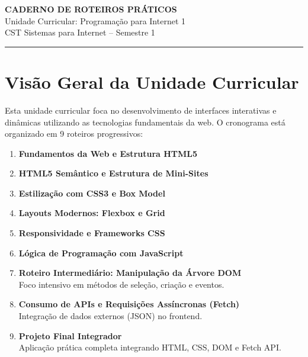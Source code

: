 \documentclass[12pt,a4paper]{article}
\begin{document}
\begin{center}
    {\Large \textbf{CADERNO DE ROTEIROS PRÁTICOS}}\\
    Unidade Curricular: Programação para Internet 1\\
    CST Sistemas para Internet -- Semestre 1
\end{center}

\vspace{0.5cm}
\hrule
\vspace{0.8cm}

\tableofcontents
\newpage

\section{Visão Geral da Unidade Curricular}

Esta unidade curricular foca no desenvolvimento de interfaces interativas e dinâmicas utilizando as tecnologias fundamentais da web. O cronograma está organizado em 9 roteiros progressivos:

\begin{enumerate}
    \item \textbf{Fundamentos da Web e Estrutura HTML5}
    \item \textbf{HTML5 Semântico e Estrutura de Mini-Sites}
    \item \textbf{Estilização com CSS3 e Box Model}
    \item \textbf{Layouts Modernos: Flexbox e Grid}
    \item \textbf{Responsividade e Frameworks CSS}
    \item \textbf{Lógica de Programação com JavaScript}
    \item \textbf{Roteiro Intermediário: Manipulação da Árvore DOM} \\
    Foco intensivo em métodos de seleção, criação e eventos.
    \item \textbf{Consumo de APIs e Requisições Assíncronas (Fetch)} \\
    Integração de dados externos (JSON) no frontend.
    \item \textbf{Projeto Final Integrador} \\
    Aplicação prática completa integrando HTML, CSS, DOM e Fetch API.
\end{enumerate}

\newpage

\end{document}

